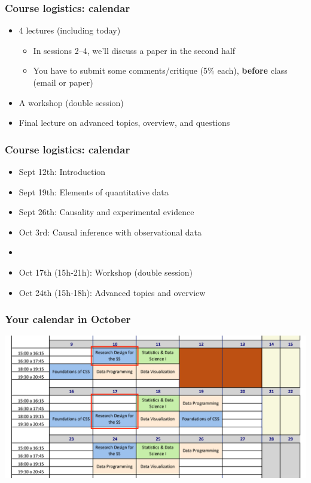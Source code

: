 \documentclass[aspectratio=43]{beamer}
\begin{document}
\begin{frame}
\frametitle{Course logistics: calendar}
\centering

\begin{itemize}
  \item 4 lectures (including today)
  \begin{itemize}
    \item In sessions 2--4, we'll discuss a paper in the second half
    \item You have to submit some comments/critique (5\% each), \textbf{before} class (email or paper)
  \end{itemize}
  \item A workshop (double session)
  \item Final lecture on advanced topics, overview, and questions
\end{itemize}

\end{frame}

\begin{frame}
\frametitle{Course logistics: calendar}
\centering

\begin{itemize}
  \item Sept 12th: Introduction
  \item Sept 19th: Elements of quantitative data
  \item Sept 26th: Causality and experimental evidence
  \item Oct 3rd: Causal inference with observational data
  \item {}
  \item Oct 17th (15h-21h): Workshop (double session)
  \item Oct 24th (15h-18h): Advanced topics and overview
\end{itemize}

\end{frame}

\begin{frame}
\frametitle{Your calendar in October}
\centering

\includegraphics[width = \textwidth]{img/calendar}

\end{frame}
\end{document}
